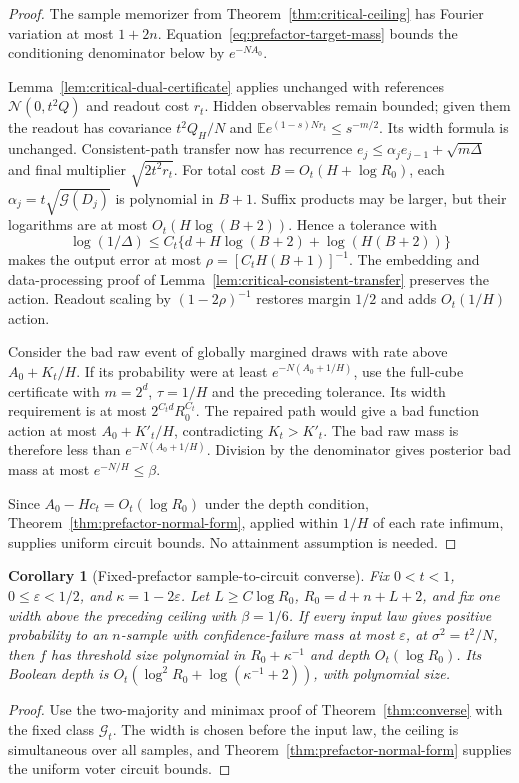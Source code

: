 \documentclass[11pt]{article}
\newtheorem{corollary}[theorem]{Corollary}
\theoremstyle{remark}
\newcommand{\E}{\mathbb E}
\newcommand{\Gain}{\mathcal G}
\begin{document}
\begin{proof}
The sample memorizer from
Theorem~\ref{thm:critical-ceiling} has Fourier variation at
most $1+2n$. Equation~\eqref{eq:prefactor-target-mass} bounds
the conditioning denominator below by $e^{-NA_0}$.

Lemma~\ref{lem:critical-dual-certificate} applies unchanged
with references $\mathcal N(0,t^2Q)$ and readout cost $r_t$.
Hidden observables remain bounded; given them the readout has
covariance $t^2Q_H/N$ and
$\E e^{(1-s)Nr_t}\le s^{-m/2}$. Its width formula is unchanged.
Consistent-path transfer now has recurrence
$e_j\le\alpha_j e_{j-1}+\sqrt{m\Delta}$ and final multiplier
$\sqrt{2t^2r_t}$. For total cost $B=O_t(H+\log R_0)$,
each $\alpha_j=t\sqrt{\Gain(D_j)}$ is polynomial in $B+1$.
Suffix products may be larger, but their logarithms are at
most $O_t(H\log(B+2))$. Hence a tolerance with
\[
 \log(1/\Delta)\le
 C_t\{d+H\log(B+2)+\log(H(B+2))\}
\]
makes the output error at most
$\rho=[C_tH(B+1)]^{-1}$. The embedding and data-processing
proof of Lemma~\ref{lem:critical-consistent-transfer}
preserves the action. Readout scaling by $(1-2\rho)^{-1}$
restores margin $1/2$ and adds $O_t(1/H)$ action.

Consider the bad raw event of globally margined draws with
rate above $A_0+K_t/H$. If its probability were at least
$e^{-N(A_0+1/H)}$, use the full-cube certificate with
$m=2^d$, $\tau=1/H$ and the preceding tolerance.
Its width requirement is at most $2^{C_t d}R_0^{C_t}$.
The repaired path would give a bad function action at most
$A_0+K'_t/H$, contradicting $K_t>K'_t$.
The bad raw mass is therefore less than $e^{-N(A_0+1/H)}$.
Division by the denominator gives posterior bad mass at most
$e^{-N/H}\le\beta$.

Since $A_0-Hc_t=O_t(\log R_0)$ under the depth condition,
Theorem~\ref{thm:prefactor-normal-form}, applied within $1/H$
of each rate infimum, supplies uniform circuit bounds.
No attainment assumption is needed.
\end{proof}

\begin{corollary}[Fixed-prefactor sample-to-circuit converse]
\label{cor:prefactor-converse}
Fix $0<t<1$, $0\le\varepsilon<1/2$, and
$\kappa=1-2\varepsilon$. Let $L\ge C\log R_0$,
$R_0=d+n+L+2$, and fix one width above the preceding
ceiling with $\beta=1/6$. If every input law gives positive
probability to an $n$-sample with confidence-failure mass at
most $\varepsilon$, at $\sigma^2=t^2/N$, then $f$ has
threshold size polynomial in $R_0+\kappa^{-1}$ and depth
$O_t(\log R_0)$. Its Boolean depth is
$O_t(\log^2R_0+\log(\kappa^{-1}+2))$, with polynomial size.
\end{corollary}
\begin{proof}
Use the two-majority and minimax proof of
Theorem~\ref{thm:converse} with the fixed class $\mathcal G_t$.
The width is chosen before the input law, the ceiling is
simultaneous over all samples, and
Theorem~\ref{thm:prefactor-normal-form} supplies the uniform
voter circuit bounds.
\end{proof}
\end{document}
